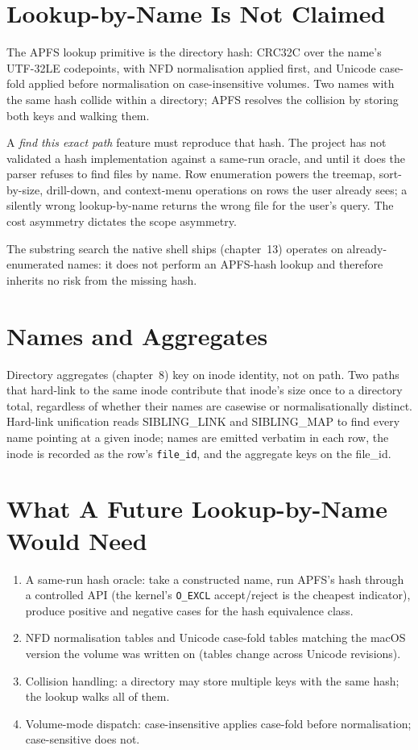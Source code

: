 \section{Lookup-by-Name Is Not Claimed}

The APFS lookup primitive is the directory hash: CRC32C over the
name's UTF-32LE codepoints, with NFD normalisation applied first,
and Unicode case-fold applied before normalisation on
case-insensitive volumes. Two names with the same hash collide
within a directory; APFS resolves the collision by storing both
keys and walking them.

A \emph{find this exact path} feature must reproduce that hash. The
project has not validated a hash implementation against a same-run
oracle, and until it does the parser refuses to find files by name.
Row enumeration powers the treemap, sort-by-size, drill-down, and
context-menu operations on rows the user already sees; a silently
wrong lookup-by-name returns the wrong file for the user's query.
The cost asymmetry dictates the scope asymmetry.

The substring search the native shell ships (chapter~13) operates
on already-enumerated names: it does not perform an APFS-hash
lookup and therefore inherits no risk from the missing hash.

\section{Names and Aggregates}

Directory aggregates (chapter~8) key on inode identity, not on
path. Two paths that hard-link to the same inode contribute that
inode's size once to a directory total, regardless of whether their
names are casewise or normalisationally distinct. Hard-link
unification reads SIBLING\_LINK and SIBLING\_MAP to find every name
pointing at a given inode; names are emitted verbatim in each row,
the inode is recorded as the row's \texttt{file\_id}, and the
aggregate keys on the file\_id.

\section{What A Future Lookup-by-Name Would Need}

\begin{enumerate}
  \item A same-run hash oracle: take a constructed name, run
    APFS's hash through a controlled API (the kernel's
    \texttt{O\_EXCL} accept/reject is the cheapest indicator),
    produce positive and negative cases for the hash equivalence
    class.
  \item NFD normalisation tables and Unicode case-fold tables
    matching the macOS version the volume was written on
    (tables change across Unicode revisions).
  \item Collision handling: a directory may store multiple keys
    with the same hash; the lookup walks all of them.
  \item Volume-mode dispatch: case-insensitive applies case-fold
    before normalisation; case-sensitive does not.
\end{enumerate}
